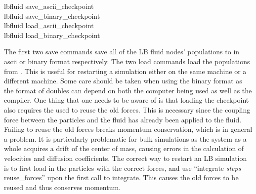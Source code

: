 \begin{essyntax}
  lbfluid save_ascii_checkpoint \\
  lbfluid save_binary_checkpoint \\
  lbfluid load_ascii_checkpoint \\
  lbfluid load_binary_checkpoint 
\end{essyntax}
The first two save commands save all of the LB fluid nodes' populations to
 in ascii or binary format respectively.  The two load commands
load the populations from .  This is  useful for restarting a
simulation either on the same machine or a different machine.  Some care should
be taken when using the binary format as the format of doubles can depend
on both the computer being used as well as the compiler. One thing that one
needs to be aware of is that loading the checkpoint also requires the used to
reuse the old forces. This is necessary since the coupling force between the
particles and the fluid has already been applied to the fluid. Failing to reuse
the old forces breaks momentum conservation, which is in general a problem. It
is particularly problematic for bulk simulations as the system as a whole
acquires a drift of the center of mass, causing errors in the calculation of
velocities and diffusion coefficients.  The correct way to restart
an LB simulation is to first load in the particles with the correct forces, and
use ``integrate \textit{steps} reuse_forces'' upon the first call to integrate.
This causes the old forces to be reused and thus conserves momentum.

